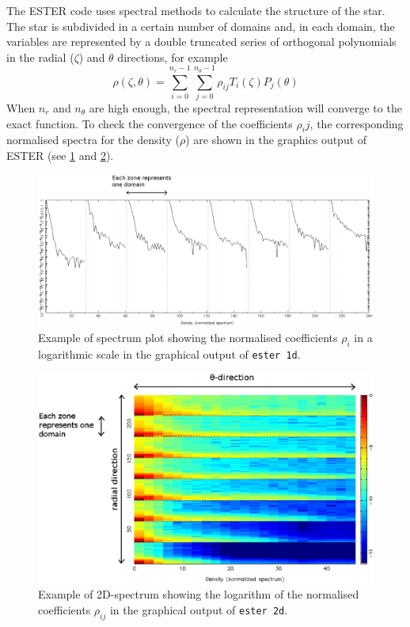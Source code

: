 The ESTER code uses spectral methods to calculate the structure of the star. 
The star is subdivided in a certain number of domains and, in each domain, the variables
are represented by a double truncated series of orthogonal polynomials in the radial ($\zeta$)
 and $\theta$ directions, for example
$$\rho(\zeta,\theta)=\sum_{i=0}^{n_r-1}\sum_{j=0}^{n_\theta-1}\rho_{ij}T_i(\zeta)P_j(\theta)$$
When $n_r$ and $n_\theta$ are high enough, the spectral representation will converge to the
exact function. 
To check the convergence of the coefficients $\rho_ij$, the corresponding normalised spectra
for the density ($\rho$) 
are shown in the graphics output of ESTER (see \ref{fig:spectrum1d} and \ref{fig:spectrum2d}).
\begin{figure}[H]
\includegraphics[width=\textwidth]{fig/spectrum1d.eps}
\caption{Example of spectrum plot showing the normalised coefficients $\rho_{i}$ in a logarithmic scale
 in the graphical output of {\tt ester 1d}.
\label{fig:spectrum1d}}
\end{figure} 
\begin{figure}[H]
\includegraphics[width=\textwidth]{fig/spectrum2d.eps}
\caption{Example of 2D-spectrum showing the logarithm of the normalised coefficients $\rho_{ij}$ 
in the graphical output of {\tt ester 2d}.
\label{fig:spectrum2d}}
\end{figure}

